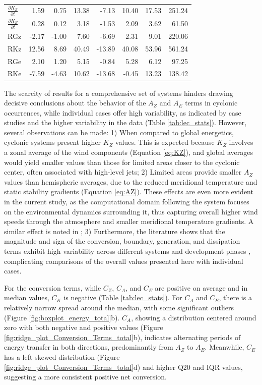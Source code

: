 \begin{table}[!htbp]
\begin{tabular}{lrrrrrrr}
$\frac{\partial K_Z}{\partial t}$ & 1.59 & 0.75 & 13.38 & -7.13 & 10.40 & 17.53 & 251.24 \\
$\frac{\partial K_E}{\partial t}$ & 0.28 & 0.12 & 3.18 & -1.53 & 2.09 & 3.62 & 61.50 \\
RGz & -2.17 & -1.00 & 7.60 & -6.69 & 2.31 & 9.01 & 220.06 \\
RKz & 12.56 & 8.69 & 40.49 & -13.89 & 40.08 & 53.96 & 561.24 \\
RGe & 2.10 & 1.20 & 5.15 & -0.84 & 5.28 & 6.12 & 97.25 \\
RKe & -7.59 & -4.63 & 10.62 & -13.68 & -0.45 & 13.23 & 138.42 \\
\bottomrule
\bottomrule
\end{tabular}
\end{table}

The scarcity of results for a comprehensive set of systems hinders drawing decisive conclusions about the behavior of the $A_Z$ and $A_E$ terms in cyclonic occurrences, while individual cases offer high variability, as indicated by case studies \citep[e.g.,]{brennan1980zonal,dias2011energy,pezza2014large} and the higher variability in the data (Table \ref{tab:lec_stats}). However, several observations can be made:  1) When compared to global energetics, cyclonic systems present higher $K_Z$ values. This is expected because $K_Z$ involves a zonal average of the wind components (Equation \ref{eq:KZ}), and global averages would yield smaller values than those for limited areas closer to the cyclonic center, often associated with high-level jets; 2) Limited areas provide smaller $A_Z$ values than hemispheric averages, due to the reduced meridional temperature and static stability gradients (Equation \ref{eq:AZ}). These effects are even more evident in the current study, as the computational domain following the system focuses on the environmental dynamics surrounding it, thus capturing overall higher wind speeds through the atmosphere and smaller meridional temperature gradients. A similar effect is noted in \citet{michaelides1999quasi}; 3) Furthermore, the literature shows that the magnitude and sign of the conversion, boundary, generation, and dissipation terms exhibit high variability across different systems and development phases \citep[e.g.,]{brennan1980zonal,smith1980energetics,michaelides1987limited,bulic2006limited,dias2011energy,black2013universal}, complicating comparisons of the overall values presented here with individual cases.

For the conversion terms, while $C_Z$, $C_A$, and $C_E$ are positive on average and in median values, $C_K$ is negative (Table \ref{tab:lec_stats}). For $C_A$ and $C_E$, there is a relatively narrow spread around the median, with some significant outliers (Figure \ref{fig:boxplot_energy_total}b). $C_A$, showing a distribution centered around zero with both negative and positive values (Figure \ref{fig:ridge_plot_Conversion_Terms_total}b), indicates alternating periods of energy transfer in both directions, predominantly from $A_Z$ to $A_E$. Meanwhile, $C_E$ has a left-skewed distribution (Figure \ref{fig:ridge_plot_Conversion_Terms_total}d) and higher Q20 and IQR values, suggesting a more consistent positive net conversion. 

